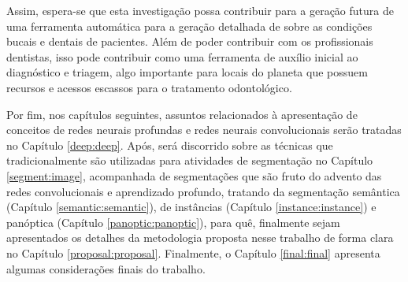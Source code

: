 Assim, espera-se que esta investigação possa contribuir para a geração futura de uma ferramenta automática para a geração detalhada de sobre as condições bucais e dentais de pacientes. Além de poder contribuir com os profissionais dentistas, isso pode contribuir como uma ferramenta de auxílio inicial ao diagnóstico e triagem, algo importante para locais do planeta que possuem recursos e acessos escassos para o tratamento odontológico.

Por fim, nos capítulos seguintes, assuntos relacionados à apresentação de conceitos de redes neurais profundas e redes neurais convolucionais serão tratadas no Capítulo \ref{deep:deep}. Após, será discorrido sobre as técnicas que tradicionalmente são utilizadas para atividades de segmentação no Capítulo \ref{segment:image}, acompanhada de segmentações que são fruto do advento das redes convolucionais e aprendizado profundo, tratando da segmentação semântica (Capítulo \ref{semantic:semantic}), de instâncias (Capítulo \ref{instance:instance}) e panóptica (Capítulo \ref{panoptic:panoptic}), para quê, finalmente sejam apresentados os detalhes da metodologia proposta nesse trabalho de forma clara no Capítulo \ref{proposal:proposal}.  Finalmente, o Capítulo \ref{final:final} apresenta algumas considerações finais do trabalho.
